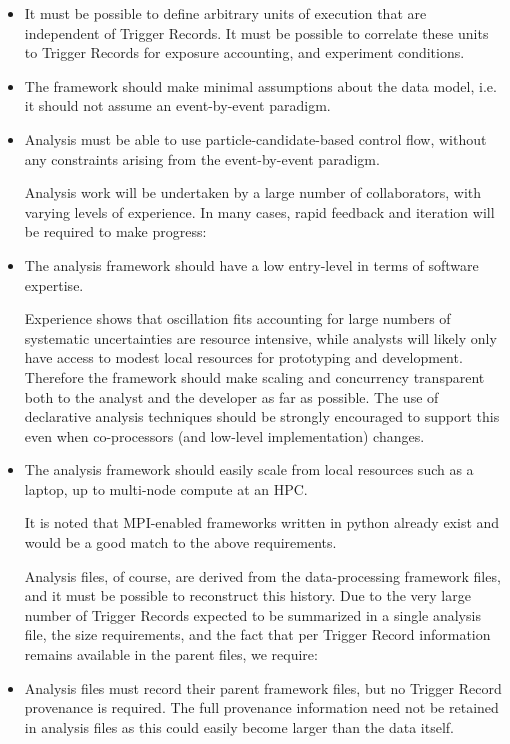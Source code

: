 \documentclass[../main-v1.tex]{subfiles}
\begin{document}
\begin{itemize}
\item It must be possible to define arbitrary units of execution that are independent of Trigger Records.  It must be possible to correlate these units to Trigger Records for exposure accounting, and experiment conditions.


\item The framework should make minimal assumptions about the data model, i.e. it should not assume an event-by-event paradigm.

\item Analysis must be able to use particle-candidate-based control flow, without any constraints arising from the event-by-event paradigm.


Analysis work will be undertaken by a large number of collaborators, with varying levels of experience. In many cases, rapid feedback and iteration will be required to make progress:

\item The analysis framework should have a low entry-level in terms of software expertise.

Experience shows that oscillation fits accounting for large numbers of systematic uncertainties are resource intensive, while analysts will likely only have access to modest local resources for prototyping and development.  Therefore the framework should make scaling and concurrency transparent both to the analyst and the developer as far as possible.  The use of declarative analysis techniques should be strongly encouraged to support this even when co-processors (and low-level implementation) changes.

\item The analysis framework should easily scale from local resources such as a laptop, up to multi-node compute at an HPC.

It is noted that MPI-enabled frameworks written in python already exist and would be a good match to the above requirements.

Analysis files, of course, are derived from the data-processing framework files, and it must be possible to reconstruct this history. Due to the very large number of Trigger Records expected to be summarized in a single analysis file, the size requirements, and the fact that per Trigger Record information remains available in the parent files, we require:

\item Analysis files must record their parent framework files, but no Trigger Record provenance is required.  The full provenance information need not be retained in analysis files as this could easily become larger than the data itself.


\end{itemize}
\end{document}
